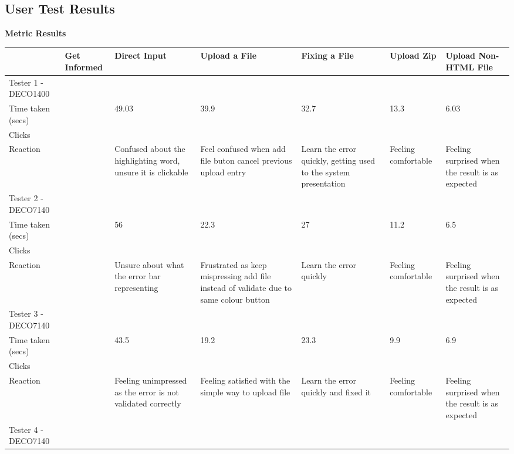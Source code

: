 \documentclass[10pt]{article}
\begin{document}
\begin{landscape}
\pagestyle{empty}
\subsection{User Test Results}

\textbf{Metric Results}

\begin{center}
\begin{longtabu} to 10in {l|l|X<{\strut}|X<{\strut}|X<{\strut}|X<{\strut}|X<{\strut}}
~& Get Informed & Direct Input & Upload a File  & Fixing a File& Upload Zip  & Upload Non-HTML File  \\ \hline\hline
Tester 1 - DECO1400  & ~& ~& ~  & ~& ~   & ~ \\ \hline\hline
Time taken (secs)& ~& 49.03& 39.9   & 32.7 & 13.3& 6.03  \\ \hline
Clicks   & ~& ~& ~  & ~& ~   & ~ \\ \hline
Reaction & ~& Confused about the highlighting word, unsure it is clickable & Feel confused when add file buton cancel previous upload entry & Learn the error quickly, getting used to the system presentation & Feeling comfortable & Feeling surprised when the result is as expected  \\ \hline\hline
Tester 2 - DECO7140  & ~& ~& ~  & ~& ~   & ~ \\ \hline\hline
Time taken (secs)& ~& 56   & 22.3   & 27   & 11.2& 6.5   \\ \hline
Clicks   & ~& ~& ~  & ~& ~   & ~ \\ \hline
Reaction & ~& Unsure about what the error bar representing & Frustrated as keep mispressing add file instead of validate due to same colour button  & Learn the error quickly  & Feeling comfortable & Feeling surprised when the result is as expected  \\ \hline\hline
Tester 3 - DECO7140  & ~& ~& ~  & ~& ~   & ~ \\ \hline\hline
Time taken (secs)& ~& 43.5 & 19.2   & 23.3 & 9.9 & 6.9   \\ \hline
Clicks   & ~& ~& ~  & ~& ~   & ~ \\ \hline
Reaction & ~& Feeling unimpressed as the error is not validated correctly  & Feeling satisfied with the simple way to upload file   & Learn the error quickly and fixed it & Feeling comfortable & Feeling surprised when the result is as expected  \\ \hline\hline
Tester 4 - DECO7140  & ~& ~& ~  & ~& ~   & ~ \\ \hline\hline

\end{longtabu}
\end{center}
\end{landscape}
\end{document}
